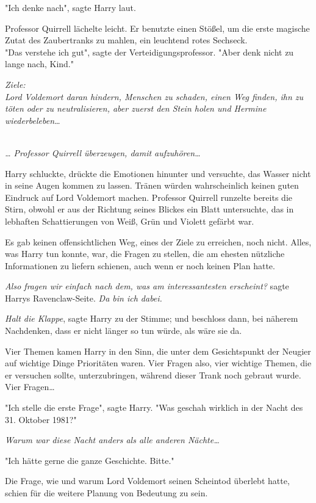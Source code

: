 {"Ich denke nach", sagte Harry laut.

Professor Quirrell lächelte leicht. Er benutzte einen Stößel, um die erste magische Zutat des Zaubertranks zu mahlen, ein leuchtend rotes Sechseck.\\ "Das verstehe ich gut", sagte der Verteidigungsprofessor. "Aber denk nicht zu lange nach, Kind."

\emph{Ziele:\\ Lord Voldemort daran hindern, Menschen zu schaden, einen Weg finden, ihn zu töten oder zu neutralisieren, aber zuerst den Stein holen und Hermine wiederbeleben…\\ }\strut \\ \emph{… Professor Quirrell überzeugen, damit aufzuhören…}

Harry schluckte, drückte die Emotionen hinunter und versuchte, das Wasser nicht in seine Augen kommen zu lassen. Tränen würden wahrscheinlich keinen guten Eindruck auf Lord Voldemort machen. Professor Quirrell runzelte bereits die Stirn, obwohl er aus der Richtung seines Blickes ein Blatt untersuchte, das in lebhaften Schattierungen von Weiß, Grün und Violett gefärbt war.

Es gab keinen offensichtlichen Weg, eines der Ziele zu erreichen, noch nicht. Alles, was Harry tun konnte, war, die Fragen zu stellen, die am ehesten nützliche Informationen zu liefern schienen, auch wenn er noch keinen Plan hatte.

\emph{Also fragen wir einfach nach dem, was am interessantesten erscheint?} sagte Harrys Ravenclaw-Seite. \emph{Da bin ich dabei.}

\emph{Halt die Klappe}, sagte Harry zu der Stimme; und beschloss dann, bei näherem Nachdenken, dass er nicht länger so tun würde, als wäre sie da.

Vier Themen kamen Harry in den Sinn, die unter dem Gesichtspunkt der Neugier auf wichtige Dinge Prioritäten waren. Vier Fragen also, vier wichtige Themen, die er versuchen sollte, unterzubringen, während dieser Trank noch gebraut wurde. Vier Fragen…

"Ich stelle die erste Frage", sagte Harry. "Was geschah wirklich in der Nacht des 31. Oktober 1981?"

\emph{Warum war diese Nacht anders als alle anderen Nächte…}

"Ich hätte gerne die ganze Geschichte. Bitte."

Die Frage, wie und warum Lord Voldemort seinen Scheintod überlebt hatte, schien für die weitere Planung von Bedeutung zu sein.

}
